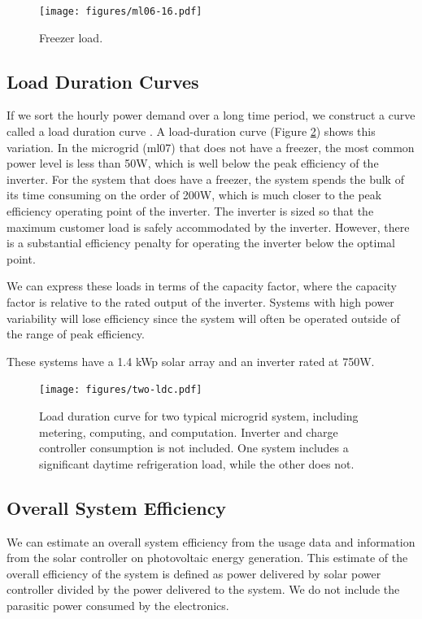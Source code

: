 \documentclass[conference]{IEEEtran}
\begin{document}
\begin{figure}[]
\begin{center}
\texttt{[image: figures/ml06-16.pdf]}
\end{center}
\caption{Freezer load.}
\label{freezer}
\end{figure}

\subsection{Load Duration Curves}
If we sort the hourly power demand over a long time period, we
construct a curve called a load duration curve \cite{REEPS}.
A load-duration curve (Figure \ref{ldc}) shows this variation.
In the microgrid (ml07) that does not have a freezer, the most common
power level is less than 50W, which is well below the peak
efficiency of the inverter.
For the system that does have a freezer, the system spends the bulk
of its time consuming on the order of 200W, which is much closer
to the peak efficiency operating point of the inverter.
The inverter is sized so that the maximum customer load is safely
accommodated by the inverter.
However, there is a substantial efficiency penalty for operating the
inverter below the optimal point.

We can express these loads in terms of the capacity factor,
where the capacity factor is relative to the rated output
of the inverter.
Systems with high power variability will lose efficiency since
the system will often be operated outside of the range of
peak efficiency.

These systems have a 1.4 kWp solar array and an inverter rated
at 750W.

\begin{figure}[h]
\begin{center}
\texttt{[image: figures/two-ldc.pdf]}
\end{center}
\caption{Load duration curve for two typical microgrid system,
including metering, computing, and computation.
Inverter and charge controller consumption is not included.
One system includes a significant daytime refrigeration load,
while the other does not.
}
\label{ldc}
\end{figure}

\subsection{Overall System Efficiency}

We can estimate an overall system efficiency from the
usage data and information from the solar controller
on photovoltaic energy generation.
This estimate of the overall efficiency of the system
is defined as power delivered by solar
power controller divided by the power delivered to the system.
We do not include the parasitic power consumed by the electronics.
\end{document}
